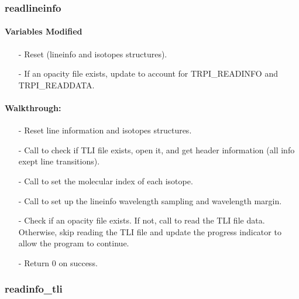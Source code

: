 \documentclass[letterpaper,12pt]{article}
\begin{document}
 \newline

\subsubsection{readlineinfo}
\paragraph{Variables Modified}
\begin{enumerate}[leftmargin=10pt, noitemsep, parsep=0pt, topsep=0ex]
\item[-] Reset  (lineinfo and
  isotopes structures).
\item[-] If an opacity file exists, update  to account for TRPI\_READINFO and TRPI\_READDATA.
\end{enumerate}

\paragraph{Walkthrough:}
\begin{enumerate}[leftmargin=10pt, noitemsep, parsep=0pt, topsep=0ex]
\item[-] Reset line information and isotopes structures.  
\item[-] Call  to check if TLI file exists, open it, and get header information (all info exept line transitions). 
\item[-] Call  to set the molecular index of each isotope. 
\item[-] Call  to set up the lineinfo wavelength sampling and wavelength margin.
\item[-] Check if an opacity file exists. If not, call  to read the TLI file data. Otherwise, skip reading the TLI file and update the progress indicator to allow the program to continue.
\item[-] Return 0 on success.
\end{enumerate}


\subsubsection{readinfo\_tli}
\end{document}
